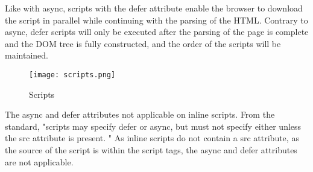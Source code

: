 
Like with async, scripts with the defer attribute enable the browser to download the script in parallel while continuing with the parsing of the HTML.
Contrary to async, defer scripts will only be executed after the parsing of the page is complete and the DOM tree is fully constructed,  and the order of the scripts will be maintained.  %


\begin{figure}[h!]
\begin{center}
\texttt{[image: scripts.png]}
\caption{Scripts}
\label{img:latency}
\end{center}
\end{figure}


The async and defer attributes not applicable on inline scripts.
From the standard, "scripts may specify defer or async, but must not specify either unless the src attribute is present. " %
As inline scripts do not contain a src attribute, as the source of the script is within the script tags, the async and defer attributes are not applicable.














